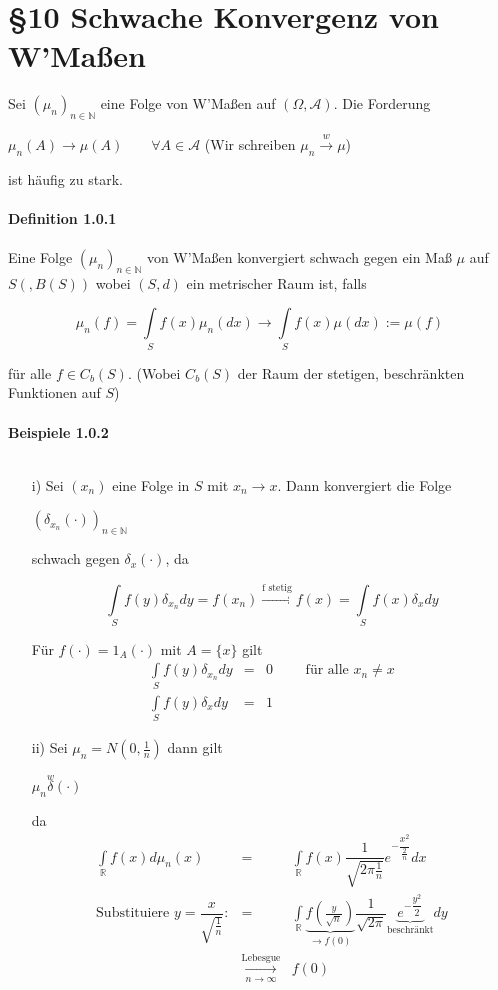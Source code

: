 \documentclass[10pt,a4paper]{report}
\newcommand{\N}{\mathbb{N}}
\newcommand{\R}{\mathbb{R}}
\numberwithin{equation}{section}
\numberwithin{figure}{section}
\theoremstyle{plain}
\theoremstyle{definition}
\theoremstyle{plain}
\theoremstyle{definition}
\theoremstyle{remark}
\theoremstyle{plain}
\begin{document}
\chapter*{\S 10 \qquad Schwache Konvergenz von W'Maßen}
Sei $(\mu_n)_{n \in \N}$ eine Folge von W'Maßen auf $(\Omega,\mathcal{A})$. Die Forderung
\begin{center}
$\mu_n(A) \to \mu(A) \qquad \forall A \in \mathcal{A}$ (Wir schreiben $\mu_n \overset{w}{\to} \mu$)
\end{center}
ist häufig zu stark.\\\\
\textbf{Definition 1.0.1}\\\\
Eine Folge $(\mu_n)_{n \in \N}$ von W'Maßen konvergiert schwach gegen ein Maß $\mu$ auf $S(,B(S))$ wobei $(S,d)$ ein metrischer Raum ist, falls
\begin{center}
\[\mu_n(f)=\int\limits_S f(x)\mu_n(dx) \to \int\limits_Sf(x)\mu(dx):=\mu(f)\]
\end{center}
für alle $f \in C_b(S)$. (Wobei $C_b(S)$ der Raum der stetigen, beschränkten Funktionen auf $S$)\\\\
\textbf{Beispiele 1.0.2}\\\\
\begin{itemize}
\item[i)] Sei $(x_n)$ eine Folge in $S$ mit $x_n \to x$. Dann konvergiert die Folge 
\begin{center}
$(\delta_{x_n}(\cdot))_{n \in \N}$
\end{center}
schwach gegen $\delta_x(\cdot)$, da
\begin{center}
\[\int\limits_Sf(y)\delta_{x_n} dy=f(x_n) \overset{\text{f stetig}}{\to} f(x)=\int\limits_S f(x)\delta_x dy \]
\end{center}
Für $f(\cdot)=1_A(\cdot)$ mit $A=\{x\}$ gilt
\begin{eqnarray*}
\int\limits_S f(y)\delta_{x_n} dy &=& 0 \qquad \text{ für alle } x_n \neq x\\
\int\limits_S f(y) \delta_x  dy &=& 1
\end{eqnarray*}
\item[ii)] Sei $\mu_n=N(0,\frac{1}{n})$ dann gilt
\begin{center}
$\mu_n \overset{w} \delta(\cdot)$
\end{center}
da
\begin{eqnarray*}
\int\limits_\R f(x) d\mu_n(x) &=& \int\limits_\R f(x)\dfrac{1}{\sqrt{2\pi \frac{1}{n}}}e^{-\dfrac{x^2}{\frac{2}{n}}} dx\\
\text{Substituiere } y=\dfrac{x}{\sqrt{\frac{1}{n}}}: &=& \int\limits_\R \underbrace{f\left(\frac{y}{\sqrt{n}}\right)}_{\to f(0)} \dfrac{1}{\sqrt{2\pi}}\underbrace{e^{-\dfrac{y^2}{2}}}_{\text{beschränkt}} dy\\
&\underset{n \to \infty}{\overset{\text{Lebesgue}}{\to}} &f(0)
\end{eqnarray*}
\end{itemize}
\end{document}
